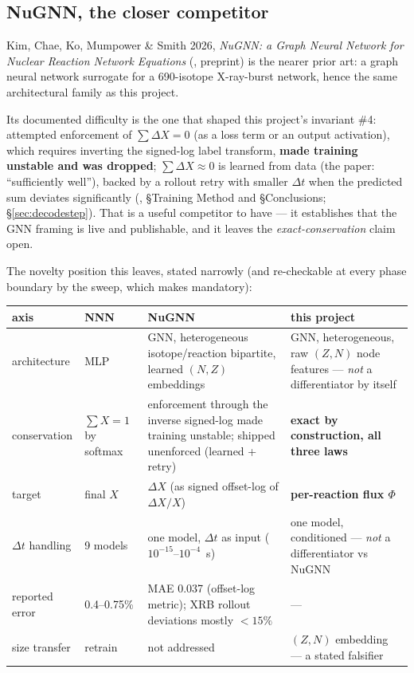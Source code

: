 \subsection{NuGNN, the closer competitor}
\label{sec:nugnn}

Kim, Chae, Ko, Mumpower \& Smith 2026, \emph{NuGNN: a Graph Neural Network for
Nuclear Reaction Network Equations} (, preprint)
\citep{kim2026} is the nearer prior art: a graph neural network surrogate for
a 690-isotope X-ray-burst network, hence the same architectural family as this
project.

Its documented difficulty is the one that shaped this project's invariant \#4:
attempted enforcement of $\sum\Delta X = 0$ (as a loss term or an output
activation), which requires inverting the signed-log label transform,
\textbf{made training unstable and was dropped}; $\sum\Delta X \approx 0$ is
learned from data (the paper: ``sufficiently well''), backed by a rollout retry
with smaller $\Delta t$ when the predicted sum deviates significantly
(\citealt{kim2026}, \S Training Method and \S Conclusions;
\S\ref{sec:decodestep}). That is a useful competitor to have --- it establishes
that the GNN framing is live and publishable, and it leaves the
\emph{exact-conservation} claim open.

The novelty position this leaves, stated narrowly (and re-checkable at every
phase boundary by the  sweep, which 
makes mandatory):

\begingroup\small
\begin{tabularx}{\textwidth}{@{}L{2.1cm} L{2.6cm} L{4.6cm} Y@{}}
\toprule
\textbf{axis} & \textbf{NNN} & \textbf{NuGNN} & \textbf{this project} \\
\midrule
architecture & MLP & GNN, heterogeneous isotope/reaction bipartite, learned
  $(N,Z)$ embeddings & GNN, heterogeneous, raw $(Z,N)$ node features ---
  \emph{not} a differentiator by itself \\
conservation & $\sum X = 1$ by softmax & enforcement through the inverse
  signed-log made training unstable; shipped unenforced (learned + retry) &
  \textbf{exact by construction, all three laws} \\
target & final $X$ & $\Delta X$ (as signed offset-log of $\Delta X/X$) &
  \textbf{per-reaction flux $\Phi$} \\
$\Delta t$ handling & 9 models & one model, $\Delta t$ as input
  ($10^{-15}$--$10^{-4}$~s) & one model, conditioned --- \emph{not} a
  differentiator vs NuGNN \\
reported error & \Ye{} 0.4--0.75\% & MAE 0.037 (offset-log metric); XRB
  rollout deviations mostly $< 15\%$ & --- \\
size transfer & retrain & not addressed & $(Z,N)$ embedding --- a stated
  falsifier \\
\bottomrule
\end{tabularx}
\endgroup

